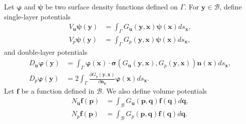 \documentclass[preprint,11pt]{elsarticle}
\theoremstyle{remark}
\newcommand{\paren}[1]{\left(#1\right)}
\newcommand{\bm}[1]{\boldsymbol{#1}}
\newcommand{\vph}{\varphi}
\begin{document}
Let $\boldsymbol \vph $ and $\boldsymbol \psi $ be two surface density functions defined on $\Gamma$.
For $\bm y\in \mathcal{B}$, define single-layer potentials 
\begin{align}
      V_{\bm u } \bm \psi (\bm y) &= \int_{\Gamma} G_{\bm u }(\bm y , \bm x ) \bm \psi (\bm x ) d s_{\bm x }, \\ 
      V_p \bm \psi (\bm y) &= \int_{\Gamma} G_p(\bm y , \bm x ) \bm \psi (\bm x ) d s_{\bm x },
\end{align}
and double-layer potentials
\begin{align}
      D_{\bm u} \bm \vph (\bm y) &= \int_{\Gamma} \bm \vph (\bm x )\cdot \bm{\sigma}\paren{ G_{\bm u }(\bm y , \bm x ), G_p(\bm y , \bm x ) }\bm{n}(\bm x ) d s_{\bm x }, \\ 
      D_p \bm \vph (\bm y)& = 2 \int_{\Gamma} \frac{\partial G_p(\bm y , \bm x )}{\partial \bm{n}_{\bm x }} \bm \vph (\bm x ) d s_{\bm x } .
\end{align}
Let $\bm{f}$ be a function defined in $\mathcal{B}$. We also define volume potentials
\begin{align}
    N_{\bm u } \bm{f}(\bm{p}) &= \int_{\mathcal{B}}  G_{\bm u }(\bm{p}, \bm{q})\bm{f}(\bm{q}) d \bm{q}, \\
    N_p \bm{f}(\bm{p}) &= \int_{\mathcal{B}}  G_p(\bm{p}, \bm{q}) \bm{f}(\bm{q}) d \bm{q} .
\end{align}
\end{document}
